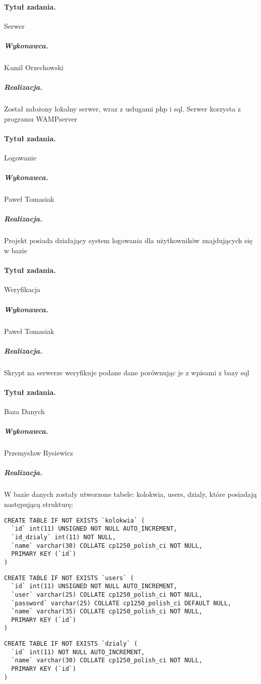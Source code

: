 \documentclass[a4paper]{article}
\begin{document}
\paragraph{Tytuł zadania.} Serwer
\subparagraph{Wykonawca.} Kamil Orzechowski
\subparagraph{Realizacja.} Został założony lokalny serwer, wraz z usługami php i sql. Serwer korzysta z programu WAMPserver

\paragraph{Tytuł zadania.} Logowanie
\subparagraph{Wykonawca.} Paweł Tomasiak
\subparagraph{Realizacja.} Projekt posiada działający system logowania dla użytkowników znajdujących się w bazie

\paragraph{Tytuł zadania.} Weryfikacja
\subparagraph{Wykonawca.} Paweł Tomasiak
\subparagraph{Realizacja.} Skrypt na serwerze weryfikuje podane dane porównując je z wpisami z bazy sql


\paragraph{Tytuł zadania.} Baza Danych
\subparagraph{Wykonawca.} Przemysław Rysiewicz
\subparagraph{Realizacja.} W bazie danych zostały utworzone tabele: kolokwia, users, dzialy, które posiadają następującą strukturę:

\begin{verbatim}
CREATE TABLE IF NOT EXISTS `kolokwia` (
  `id` int(11) UNSIGNED NOT NULL AUTO_INCREMENT,
  `id_dzialy` int(11) NOT NULL,
  `name` varchar(30) COLLATE cp1250_polish_ci NOT NULL,
  PRIMARY KEY (`id`)
)
  \end{verbatim}
  
  \begin{verbatim}
CREATE TABLE IF NOT EXISTS `users` (
  `id` int(11) UNSIGNED NOT NULL AUTO_INCREMENT,
  `user` varchar(25) COLLATE cp1250_polish_ci NOT NULL,
  `password` varchar(25) COLLATE cp1250_polish_ci DEFAULT NULL,
  `name` varchar(35) COLLATE cp1250_polish_ci NOT NULL,
  PRIMARY KEY (`id`)
)
  \end{verbatim}

  \begin{verbatim}
CREATE TABLE IF NOT EXISTS `dzialy` (
  `id` int(11) NOT NULL AUTO_INCREMENT,
  `name` varchar(30) COLLATE cp1250_polish_ci NOT NULL,
  PRIMARY KEY (`id`)
)
 \end{verbatim}
 
\end{document}
